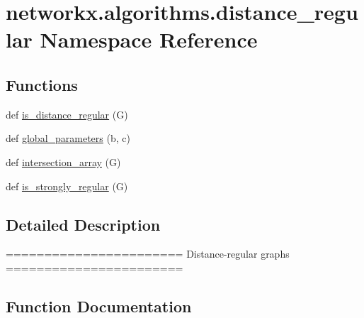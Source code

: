 \hypertarget{namespacenetworkx_1_1algorithms_1_1distance__regular}{}\section{networkx.\+algorithms.\+distance\+\_\+regular Namespace Reference}
\label{namespacenetworkx_1_1algorithms_1_1distance__regular}
\subsection*{Functions}
\begin{DoxyCompactItemize}
\item 
def \hyperlink{namespacenetworkx_1_1algorithms_1_1distance__regular_ae927cf8919904b4358d8e66e000a3c7d}{is\+\_\+distance\+\_\+regular} (G)
\item 
def \hyperlink{namespacenetworkx_1_1algorithms_1_1distance__regular_aed8d2b65d52dcb651a9ee862872bda65}{global\+\_\+parameters} (b, c)
\item 
def \hyperlink{namespacenetworkx_1_1algorithms_1_1distance__regular_a4e5e4115a9ad6a681119c7ac1a2941d4}{intersection\+\_\+array} (G)
\item 
def \hyperlink{namespacenetworkx_1_1algorithms_1_1distance__regular_a7524188ddb265807ef1e71f517dee482}{is\+\_\+strongly\+\_\+regular} (G)
\end{DoxyCompactItemize}


\subsection{Detailed Description}
\begin{DoxyVerb}=======================
Distance-regular graphs
=======================
\end{DoxyVerb}
 

\subsection{Function Documentation}
\mbox{\label{namespacenetworkx_1_1algorithms_1_1distance__regular_aed8d2b65d52dcb651a9ee862872bda65}} 
